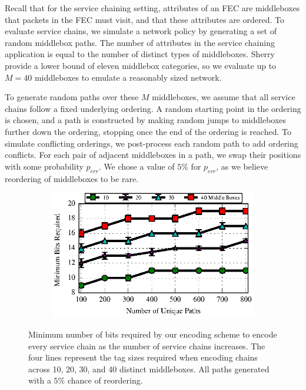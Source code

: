 Recall that for the service chaining setting, attributes of an FEC are
middleboxes that packets in the FEC must visit, and that these
attributes are ordered. 
To evaluate service chains, we simulate a network policy by generating a
set of random middlebox paths. The number of attributes in the service
chaining application is equal to the number of distinct types of
middleboxes. Sherry \ea~\cite{Sherry:2012} provide a lower bound of eleven
middlebox categories, so we evaluate up to $M = 40$ middleboxes to
emulate a reasonably sized network.  

To generate random paths over these $M$ middleboxes, we assume that all
service chains follow a fixed underlying ordering. A random starting
point in the ordering is chosen, and a path is constructed by making
random jumps to middleboxes further down the ordering, stopping once the
end of the ordering is reached.  To simulate conflicting orderings, we
post-process each random path to add ordering conflicts. For each pair
of adjacent middleboxes in a path, we swap their positions with some
probability $p_{err}$. We chose a value of $5\%$ for $p_{err}$, as we
believe reordering of middleboxes to be rare.

\begin{figure}[t!] 
\begin{minipage}{1\linewidth}
\begin{subfigure}[b]{0.96\linewidth}
\includegraphics[width=\linewidth]{figures/service_chaining_minbits_ordered}
\end{subfigure} 
\end{minipage} 
\caption{Minimum number of bits required by our encoding scheme to encode every service chain as the number of service chains increases. The four lines represent the tag sizes required when encoding chains across 10, 20, 30, and 40 distinct middleboxes. All paths generated with a $5\%$ chance of reordering.}
\label{fig:chain_bits}
\end{figure}

